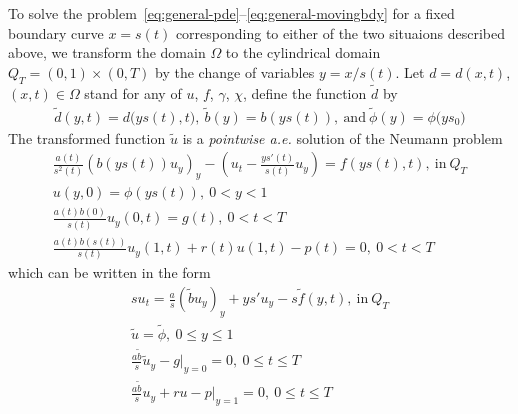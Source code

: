 \documentclass[letterpaper, 10pt]{amsart}
\theoremstyle{definition}
\theoremstyle{remark}
\begin{document}
To solve the problem~\eqref{eq:general-pde}--\eqref{eq:general-movingbdy} for a
fixed boundary curve $x=s(t)$ corresponding to either of the two situaions
described above, we transform the domain $\Omega$ to the cylindrical domain
$Q_T = (0,1)\times (0,T)$ by the change of variables $y=x/s(t)$.
Let $d = d(x, t)$, $(x, t) \in \Omega$ stand for any of $u$, $f$, $\gamma$, $\chi$, define the function $\tilde{d}$ by
\begin{gather*}
  \tilde{d}(y,t) = d\big(y s(t), t\big),~
  \tilde{b}(y) = b(y s(t)),~\text{and}~
  \tilde{\phi}(y) = \phi\big(y s_0\big)
\end{gather*}
\def\utilde{\tilde{u}}
The transformed function $\utilde$ is a \emph{pointwise a.e.} solution of the
Neumann problem
\begin{gather}
  \frac{a(t)}{s^2(t)} {(b(ys(t)) u_y)}_y
  - \left(u_t - \frac{y s'(t)}{s(t)} u_y\right)= f(ys(t),t),~\text{in}~Q_T\nonumber
  \\
  u(y,0) = \phi(ys(t)),~0<y<1\nonumber
  \\
  \frac{a(t)b(0)}{s(t)} u_y(0,t) = g(t),~0<t<T\nonumber
  \\
  \frac{a(t)b(s(t))}{s(t)} u_y(1,t) + r(t) u(1,t) - p(t)=0,~0<t<T\nonumber
\end{gather}
which can be written in the form
\begin{gather}
  s u_t = \frac{a}{s} {(\tilde{b} u_y)}_y
  + y s' u_y
  - s \tilde{f}(y,t),~\text{in}~Q_T\label{eq:tform-pde}
  \\
  \utilde = \tilde{\phi}, ~0 \leq y \leq 1 \label{eq:tform-iv}
  \\
  \frac{a \tilde{b}}{s} \utilde_y - g \vert_{y=0}= 0, ~0 \leq t \leq T   \label{eq:tform-lbdy}
  \\
  \frac{a\tilde{b}}{s} u_y + r u - p \vert_{y=1} = 0, ~0 \leq t \leq T \label{eq:tform-rbdy}
\end{gather}
\end{document}
